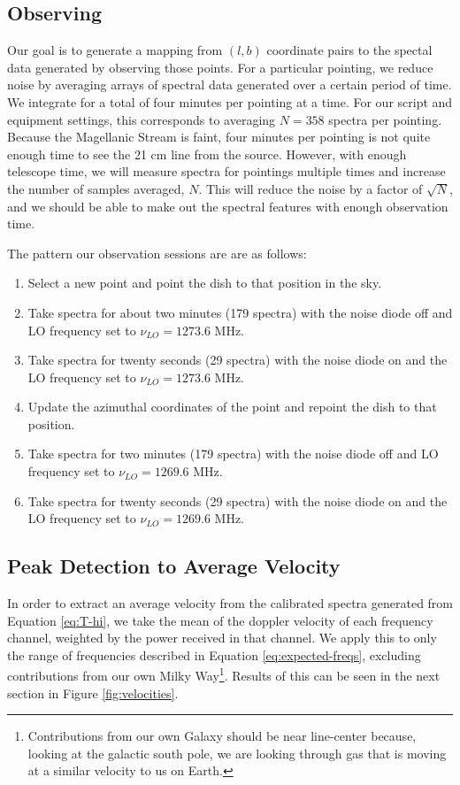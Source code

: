 \documentclass[12pt]{article}
\begin{document}
\subsection*{Observing}
Our goal is to generate a mapping from $(l, b)$ coordinate pairs to the spectal data generated by observing those points. For a particular pointing, we reduce noise by averaging arrays of spectral data generated over a certain period of time. We integrate for a total of four minutes per pointing at a time. For our script and equipment settings, this corresponds to averaging $N=358$ spectra per pointing. Because the Magellanic Stream is faint, four minutes per pointing is not quite enough time to see the 21 cm line from the source. However, with enough telescope time, we will measure spectra for pointings multiple times and increase the number of samples averaged, $N$. This will reduce the noise by a factor of $\sqrt{N}$, and we should be able to make out the spectral features with enough observation time.

The pattern our observation sessions are are as follows:
\begin{enumerate}
\item Select a new point and point the dish to that position in the sky.
\item Take spectra for about two minutes (179 spectra) with the noise diode off and LO frequency set to $\nu_{LO} = 1273.6$ MHz. 
\item Take spectra for twenty seconds (29 spectra) with the noise diode on and the LO frequency set to $\nu_{LO} = 1273.6$ MHz.
\item Update the azimuthal coordinates of the point and repoint the dish to that position.
\item Take spectra for two minutes (179 spectra) with the noise diode off and LO frequency set to $\nu_{LO} = 1269.6$ MHz. 
\item Take spectra for twenty seconds (29 spectra) with the noise diode on and the LO frequency set to $\nu_{LO} = 1269.6$ MHz.
\end{enumerate}

\subsection*{Peak Detection to Average Velocity}
In order to extract an average velocity from the calibrated spectra generated from Equation \ref{eq:T-hi}, we take the mean of the doppler velocity of each frequency channel, weighted by the power received in that channel. We apply this to only the range of frequencies described in Equation \ref{eq:expected-freqs}, excluding contributions from our own Milky Way\footnote{Contributions from our own Galaxy should be near line-center because, looking at the galactic south pole, we are looking through gas that is moving at a similar velocity to us on Earth.}. Results of this can be seen in the next section in Figure \ref{fig:velocities}.
\end{document}
